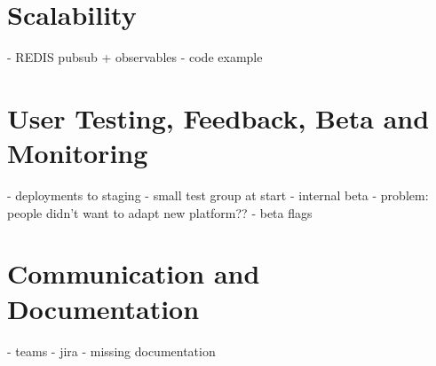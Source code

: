\section{Scalability}

- REDIS pubsub + observables
- code example

\section{User Testing, Feedback, Beta and Monitoring}
- deployments to staging
- small test group at start
- internal beta
 - problem: people didn't want to adapt new platform??
- beta flags

\section{Communication and Documentation}

- teams
- jira
- missing documentation
